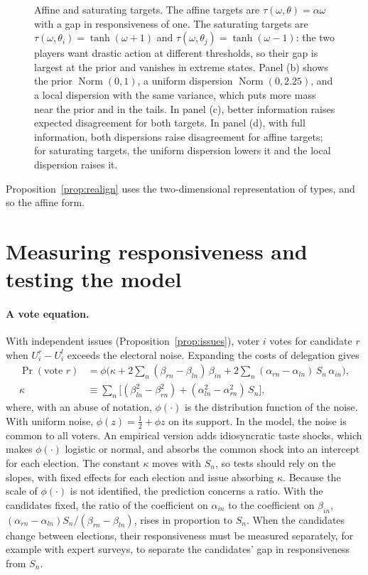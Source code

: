 \documentclass[12pt,letterpaper]{article}
\begin{document}
\begin{figure}[t]
\caption{Affine and saturating targets. The affine targets are $\tau(\omega,\theta)=\alpha\omega$ with a gap in responsiveness of one. The saturating targets are $\tau(\omega,\theta_i)=\tanh(\omega+1)$ and $\tau(\omega,\theta_j)=\tanh(\omega-1)$: the two players want drastic action at different thresholds, so their gap is largest at the prior and vanishes in extreme states. Panel (b) shows the prior $\operatorname{Norm}(0,1)$, a uniform dispersion $\operatorname{Norm}(0,2.25)$, and a local dispersion with the same variance, which puts more mass near the prior and in the tails. In panel (c), better information raises expected disagreement for both targets. In panel (d), with full information, both dispersions raise disagreement for affine targets; for saturating targets, the uniform dispersion lowers it and the local dispersion raises it.}
\label{fig:targets}
\end{figure} Proposition~\ref{prop:realign} uses the two-dimensional representation of types, and so the affine form.


\section{Measuring responsiveness and testing the model}\label{app:tests}

\paragraph{A vote equation.} With independent issues (Proposition~\ref{prop:issues}), voter $i$ votes for candidate $r$ when $U_i^r-U_i^l$ exceeds the electoral noise. Expanding the costs of delegation gives
\[
\begin{aligned}
\Pr(\text{vote } r)&=\phi\Big(\kappa+2\sum_n(\beta_{rn}-\beta_{ln})\,\beta_{in}+2\sum_n(\alpha_{rn}-\alpha_{ln})\,S_n\,\alpha_{in}\Big),\\
\kappa&\equiv\sum_n\Big[(\beta_{ln}^2-\beta_{rn}^2)+(\alpha_{ln}^2-\alpha_{rn}^2)\,S_n\Big],
\end{aligned}
\]
where, with an abuse of notation, $\phi(\cdot)$ is the distribution function of the noise. With uniform noise, $\phi(z)=\tfrac12+\phi z$ on its support. In the model, the noise is common to all voters. An empirical version adds idiosyncratic taste shocks, which makes $\phi(\cdot)$ logistic or normal, and absorbs the common shock into an intercept for each election. The constant $\kappa$ moves with $S_n$, so tests should rely on the slopes, with fixed effects for each election and issue absorbing $\kappa$. Because the scale of $\phi(\cdot)$ is not identified, the prediction concerns a ratio. With the candidates fixed, the ratio of the coefficient on $\alpha_{in}$ to the coefficient on $\beta_{in}$, $(\alpha_{rn}-\alpha_{ln})S_n/(\beta_{rn}-\beta_{ln})$, rises in proportion to $S_n$. When the candidates change between elections, their responsiveness must be measured separately, for example with expert surveys, to separate the candidates' gap in responsiveness from $S_n$.
\end{document}
